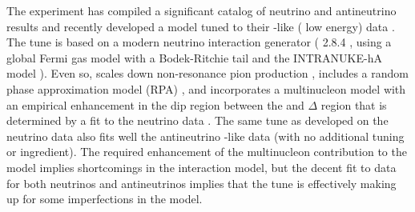 The  experiment has compiled a significant catalog of neutrino and antineutrino results and recently developed a model tuned to their -like  ( low energy) data \cite{Ruterbories:2018gub}.  The tune is based on a modern neutrino interaction generator ( 2.8.4 \cite{Andreopoulos:2009rq}, using a global Fermi gas model \cite{Smith:1972xh}  with a Bodek-Ritchie tail \cite{Bodek:1981wr} and the INTRANUKE-hA  model \cite{Dytman:2007zz}).  Even so,  scales down non-resonance pion production \cite{Rodrigues:2016xjj}, includes a random phase approximation model (RPA) \cite{Nieves:2004wx,Gran:2017psn}, and incorporates a multinucleon model \cite{Nieves:2011pp, Gran:2013kda, Schwehr:2016pvn} with an empirical enhancement in the dip region between the  and $\Delta$  region that is determined by a fit to the neutrino data \cite{Ruterbories:2018gub}.  The same tune as developed on the neutrino data also fits well the  antineutrino -like data (with no additional tuning or ingredient).  The required enhancement of the multinucleon contribution to the model implies shortcomings in the interaction model, but the decent fit to data for both neutrinos and antineutrinos implies that the tune is effectively making up for some imperfections in the model. 

